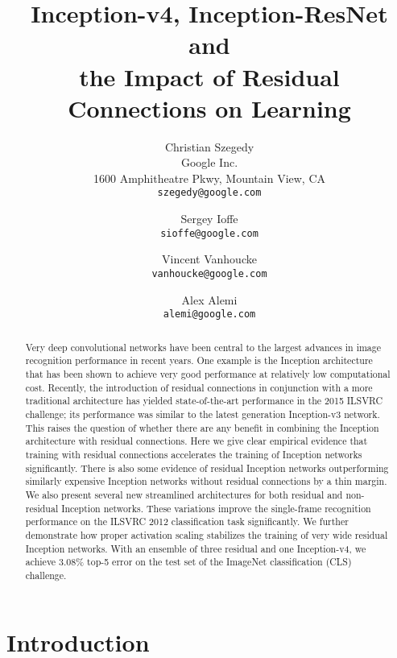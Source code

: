 \documentclass[10pt,twocolumn,letterpaper]{article}
\begin{document}
\title{Inception-v4, Inception-ResNet and\\the Impact of Residual Connections on Learning}

\author{Christian Szegedy\\
Google Inc.\\
1600 Amphitheatre Pkwy, Mountain View, CA\\
{\tt\small szegedy@google.com}
\and
Sergey Ioffe\\
{\tt\small sioffe@google.com}
\and
Vincent Vanhoucke\\
{\tt\small vanhoucke@google.com}
\and
Alex Alemi\\
{\tt\small alemi@google.com}
}

\maketitle


\begin{abstract}
Very deep convolutional networks have been central to the largest advances in image
recognition performance in recent years. One example is the Inception
architecture that has been shown to achieve very good performance at relatively
low computational cost. Recently, the introduction of residual connections
in conjunction with a more traditional architecture has yielded state-of-the-art
performance in the 2015 ILSVRC challenge; its performance was similar
to the latest generation Inception-v3 network. This raises the question of whether
there are any benefit in combining the Inception architecture with residual
connections.
Here we give clear empirical evidence that training with residual connections
accelerates the training of Inception networks significantly. There is also
some evidence of residual Inception networks outperforming similarly
expensive Inception networks without residual connections by a thin margin.
We also present several new streamlined architectures for both residual and
non-residual Inception networks. These variations improve the single-frame
recognition performance on the ILSVRC 2012 classification task significantly.
We further demonstrate how proper activation scaling stabilizes the training of
very wide residual Inception networks. With an ensemble of three residual and
one Inception-v4, we achieve 3.08\% top-5 error on the test set of
the ImageNet classification (CLS) challenge.
 \end{abstract}

\section{Introduction}
\end{document}
